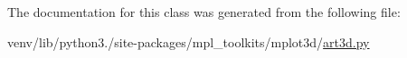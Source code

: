 The documentation for this class was generated from the following file\+:\begin{DoxyCompactItemize}
\item 
venv/lib/python3./site-\/packages/mpl\+\_\+toolkits/mplot3d/\hyperlink{art3d_8py}{art3d.\+py}\end{DoxyCompactItemize}
